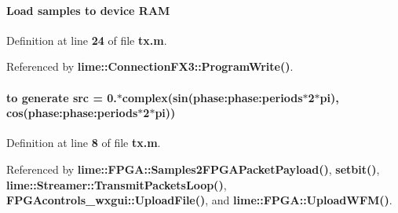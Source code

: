 \paragraph[{R\+AM}]{\setlength{\rightskip}{0pt plus 5cm}Load {\bf samples} to {\bf device} R\+AM}\label{tx_8m_af6d116d80d57c197cfb87b73c3c2586e}


Definition at line {\bf 24} of file {\bf tx.\+m}.



Referenced by {\bf lime\+::\+Connection\+F\+X3\+::\+Program\+Write()}.

\paragraph[{src}]{ to generate src = 0.$\ast$complex(sin(phase\+:phase\+:periods$\ast$2$\ast$pi), cos(phase\+:phase\+:periods$\ast$2$\ast$pi))}\label{tx_8m_a7d34a8189f5209146e79e4de490a8022}


Definition at line {\bf 8} of file {\bf tx.\+m}.



Referenced by {\bf lime\+::\+F\+P\+G\+A\+::\+Samples2\+F\+P\+G\+A\+Packet\+Payload()}, {\bf setbit()}, {\bf lime\+::\+Streamer\+::\+Transmit\+Packets\+Loop()}, {\bf F\+P\+G\+Acontrols\+\_\+wxgui\+::\+Upload\+File()}, and {\bf lime\+::\+F\+P\+G\+A\+::\+Upload\+W\+F\+M()}.

